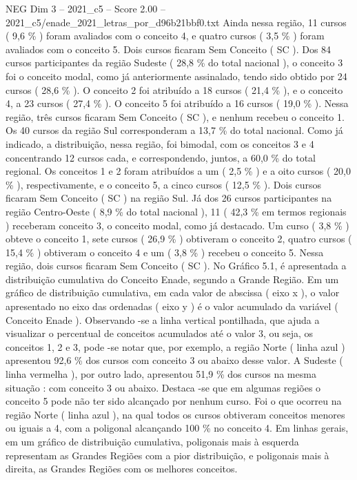 \begin{textsample}{NEG Dim 3 – 2021\_c5 – Score 2.00 – 2021\_c5/enade\_2021\_letras\_por\_d96b21bbf0.txt}
Ainda nessa região, 11 cursos ( 9,6 \% ) foram avaliados com o conceito 4, e quatro cursos ( 3,5 \% ) foram avaliados com o conceito 5.
Dois cursos ficaram Sem Conceito ( SC ).
Dos 84 cursos participantes da região Sudeste ( 28,8 \% do total nacional ), o conceito 3 foi o conceito modal, como já anteriormente assinalado, tendo sido obtido por 24 cursos ( 28,6 \% ).
O conceito 2 foi atribuído a 18 cursos ( 21,4 \% ), e o conceito 4, a 23 cursos ( 27,4 \% ).
O conceito 5 foi atribuído a 16 cursos ( 19,0 \% ).
Nessa região, três cursos ficaram Sem Conceito ( SC ), e nenhum recebeu o conceito 1.
Os 40 cursos da região Sul corresponderam a 13,7 \% do total nacional.
Como já indicado, a distribuição, nessa região, foi bimodal, com os conceitos 3 e 4 concentrando 12 cursos cada, e correspondendo, juntos, a 60,0 \% do total regional.
Os conceitos 1 e 2 foram atribuídos a um ( 2,5 \% ) e a oito cursos ( 20,0 \% ), respectivamente, e o conceito 5, a cinco cursos ( 12,5 \% ).
Dois cursos ficaram Sem Conceito ( SC ) na região Sul.
Já dos 26 cursos participantes na região Centro-Oeste ( 8,9 \% do total nacional ), 11 ( 42,3 \% em termos regionais ) receberam conceito 3, o conceito modal, como já destacado.
Um curso ( 3,8 \% ) obteve o conceito 1, sete cursos ( 26,9 \% ) obtiveram o conceito 2, quatro cursos ( 15,4 \% ) obtiveram o conceito 4 e um ( 3,8 \% ) recebeu o conceito 5.
Nessa região, dois cursos ficaram Sem Conceito ( SC ).
No Gráfico 5.1, é apresentada a distribuição cumulativa do Conceito Enade, segundo a Grande Região.
Em um gráfico de distribuição cumulativa, em cada valor de abscissa ( eixo x ), o valor apresentado no eixo das ordenadas ( eixo y ) é o valor acumulado da variável ( Conceito Enade ).
Observando -se a linha vertical pontilhada, que ajuda a visualizar o percentual de conceitos acumulados até o valor 3, ou seja, os conceitos 1, 2 e 3, pode -se notar que, por exemplo, a região Norte ( linha azul ) apresentou 92,6 \% dos cursos com conceito 3 ou abaixo desse valor.
A Sudeste ( linha vermelha ), por outro lado, apresentou 51,9 \% dos cursos na mesma situação : com conceito 3 ou abaixo.
Destaca -se que em algumas regiões o conceito 5 pode não ter sido alcançado por nenhum curso.
Foi o que ocorreu na região Norte ( linha azul ), na qual todos os cursos obtiveram conceitos menores ou iguais a 4, com a poligonal alcançando 100 \% no conceito 4.
Em linhas gerais, em um gráfico de distribuição cumulativa, poligonais mais à esquerda representam as Grandes Regiões com a pior distribuição, e poligonais mais à direita, as Grandes Regiões com os melhores conceitos.

\end{textsample}
